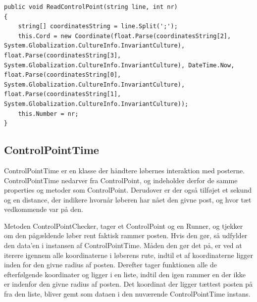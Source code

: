 \begin{lstlisting}
public void ReadControlPoint(string line, int nr)
{
    string[] coordinatesString = line.Split(';');
    this.Cord = new Coordinate(float.Parse(coordinatesString[2], System.Globalization.CultureInfo.InvariantCulture), float.Parse(coordinatesString[3], System.Globalization.CultureInfo.InvariantCulture), DateTime.Now, float.Parse(coordinatesString[0], System.Globalization.CultureInfo.InvariantCulture), float.Parse(coordinatesString[1], System.Globalization.CultureInfo.InvariantCulture));
    this.Number = nr;
}
\end{lstlisting}

\subsection{ControlPointTime}
ControlPointTime er en klasse der håndtere løbernes interaktion med posterne. ControlPointTime nedarver fra ControlPoint, og indeholder derfor de samme properties og metoder som ControlPoint. Derudover er der også tilføjet et sekund og en distance, der indikere hvornår løberen har nået den givne post, og hvor tæt vedkommende var på den. 

Metoden ControlPointChecker, tager et ControlPoint og en Runner, og tjekker om den pågældende løber rent faktisk rammer posten. Hvis den gør, så udfylder den data’en i instansen af ControlPointTime. 
Måden den gør det på, er ved at iterere igennem alle koordinaterne i løberens rute, indtil et af koordinaterne ligger inden for den givne radius af posten. Derefter tager funktionen alle de efterfølgende koordinater og ligger i en liste, indtil den igen rammer en der ikke er indenfor den givne radius af posten. 
Det koordinat der ligger tættest posten på fra den liste, bliver gemt som dataen i den nuværende ControlPointTime instans. 


